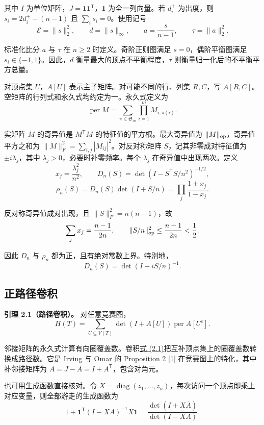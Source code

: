 \documentclass[11pt,a4paper]{article}
\makeatletter
\newcommand{\paperstatement}[3]{\par\addvspace{6pt}\Needspace{4\baselineskip}\phantomsection\def\@currentlabel{#2}\label{#3}\noindent\textbf{#1}\enspace}
\newcommand{\paperref}[2]{\hyperref[#1]{#2}}
\makeatother
\begin{document}
其中 \(I\) 为单位矩阵，\(J=\mathbf1\mathbf1^{\mathsf T}\)，\(\mathbf1\) 为全一列向量。若 \(d_i^+\) 为出度，则 \(s_i=2d_i^+-(n-1)\) 且 \(\sum_i s_i=0\)。使用记号
\[\mathcal E=\|s\|_2^2,\qquad d=\|s\|_\infty,\qquad
a=\frac{s}{n-1},\qquad \tau=\|a\|_2^2.\]

标准化比分 \(a\) 与 \(\tau\) 在 \(n\ge2\) 时定义。奇阶正则图满足 \(s=0\)，偶阶平衡图满足 \(s_i\in\{-1,1\}\)。因此，\(d\) 衡量最大的顶点不平衡程度，\(\tau\) 则衡量归一化后的不平衡平方总量。

对顶点集 \(U\)，\(A[U]\) 表示主子矩阵。对可能不同的行、列集 \(R,C\)，写 \(A[R,C]\)。空矩阵的行列式和永久式均约定为一。永久式定义为
\[\operatorname{per}M=\sum_{\pi\in\mathfrak S_m}\prod_{i=1}^m M_{i,\pi(i)}.\]

实矩阵 \(M\) 的奇异值是 \(M^{\mathsf T}M\) 的特征值的平方根。最大奇异值为 \(\|M\|_{\rm op}\)，奇异值平方之和为 \(\|M\|_F^2=\sum_{i,j}|M_{ij}|^2\)。对反对称矩阵 \(S\)，记其非零成对特征值为 \(\pm i\lambda_j\)，其中 \(\lambda_j>0\)，必要时补零频率。每个 \(\lambda_j\) 在奇异值中出现两次。定义
\[x_j=\frac{\lambda_j^2}{n^2},\qquad
D_n(S)=\det(I-S^{\mathsf T}S/n^2)^{-1/2},\]
\nopagebreak[3]\[\rho_n(S)=D_n(S)\det(I+S/n)=\prod_j\frac{1+x_j}{1-x_j}.\]

反对称奇异值成对出现，且 \(\|S\|_F^2=n(n-1)\)，故
\[\sum_jx_j=\frac{n-1}{2n},\qquad \|S/n\|_{\rm op}^2\le\frac{n-1}{2n}<\frac12.\]

因此 \(D_n\) 与 \(\rho_n\) 都为正，且有绝对常数上界。特别地，
\[D_n(S)=\det(I+iS/n)^{-1}.\]

\subsection{正路径卷积}\label{sec-2.2}

\paperstatement{引理 2.1（路径卷积）。}{2.1}{thm-2.1} 对任意竞赛图，
\begin{equation}
H(T)=\sum_{U\subseteq V(T)}\det(I+A[U])\operatorname{per}A[U^c].
\tag{2.1}\label{eq-path-convolution}
\end{equation}

邻接矩阵的永久式计算有向圈覆盖数。卷积\paperref{eq-path-convolution}{式 (2.1)}把互补顶点集上的圈覆盖数转换成路径数。它是 Irving 与 Omar 的 Proposition 2 \paperref{bib-1}{[1]} 在竞赛图上的特化，其中补邻接矩阵为 \(\overline A=J-A=I+A^{\mathsf T}\)，包含对角元。

也可用生成函数直接核对。令 \(X=\operatorname{diag}(z_1,\ldots,z_n)\)，每次访问一个顶点即乘上对应变量，则全部游走的生成函数为
\[1+\mathbf1^{\mathsf T}(I-XA)^{-1}X\mathbf1
=\frac{\det(I+X\overline A)}{\det(I-XA)}.\]
\end{document}
